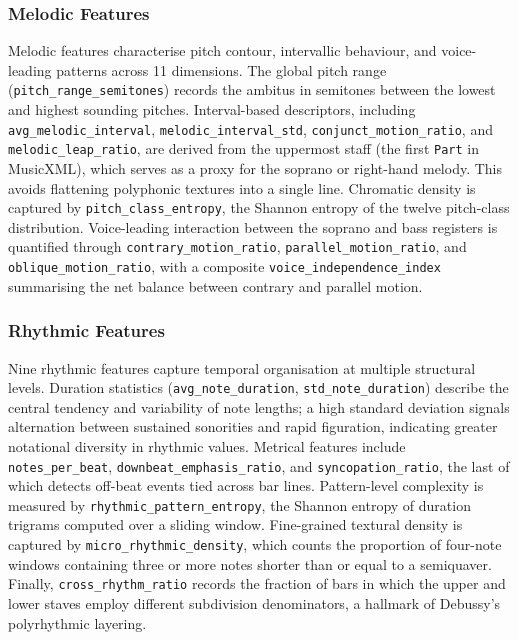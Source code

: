 \documentclass[]{interact}
\theoremstyle{plain}
\theoremstyle{definition}
\theoremstyle{remark}
\begin{document}
\subsubsection{Melodic Features}

Melodic features characterise pitch contour, intervallic behaviour, and
voice-leading patterns across 11 dimensions. The global pitch range
(\texttt{pitch\_range\_semitones}) records the ambitus in semitones between the
lowest and highest sounding pitches. Interval-based descriptors, including
\texttt{avg\_melodic\_interval}, \texttt{melodic\_interval\_std},
\texttt{conjunct\_motion\_ratio}, and \texttt{melodic\_leap\_ratio}, are derived
from the uppermost staff (the first \texttt{Part} in MusicXML), which serves as
a proxy for the soprano or right-hand melody. This avoids flattening polyphonic
textures into a single line. Chromatic density is captured by
\texttt{pitch\_class\_entropy}, the Shannon entropy of the twelve pitch-class
distribution. Voice-leading interaction between the soprano and bass registers is
quantified through \texttt{contrary\_motion\_ratio},
\texttt{parallel\_motion\_ratio}, and \texttt{oblique\_motion\_ratio}, with a
composite \texttt{voice\_independence\_index} summarising the net balance between
contrary and parallel motion.

\subsubsection{Rhythmic Features}

Nine rhythmic features capture temporal organisation at multiple structural
levels. Duration statistics (\texttt{avg\_note\_duration},
\texttt{std\_note\_duration}) describe the central tendency and variability of
note lengths; a high standard deviation signals alternation between
sustained sonorities and rapid figuration, indicating greater notational diversity
in rhythmic values. Metrical features include
\texttt{notes\_per\_beat}, \texttt{downbeat\_emphasis\_ratio}, and
\texttt{syncopation\_ratio}, the last of which detects off-beat events tied
across bar lines. Pattern-level complexity is measured by
\texttt{rhythmic\_pattern\_entropy}, the Shannon entropy of duration trigrams
computed over a sliding window. Fine-grained textural density is captured by
\texttt{micro\_rhythmic\_density}, which counts the proportion of four-note
windows containing three or more notes shorter than or equal to a semiquaver.
Finally, \texttt{cross\_rhythm\_ratio} records the fraction of bars in which the
upper and lower staves employ different subdivision denominators, a hallmark of
Debussy's polyrhythmic layering.
\end{document}
